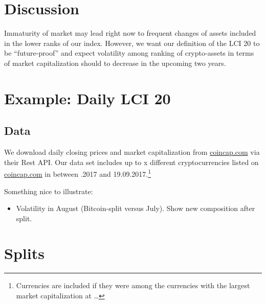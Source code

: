 \documentclass[11pt]{article}
\begin{document}
\section{Discussion}

Immaturity of market may lead right now to frequent changes of assets included in the lower ranks of our index.
However, we want our definition of the LCI 20 to be ``future-proof'' and expect volatility among ranking of crypto-assets in terms of market capitalization should to decrease in the upcoming two years.


\section{Example: Daily LCI 20}

\subsection{Data}

We download daily closing prices and market capitalization from \href{https://coincap.com}{coincap.com} via their Rest API. 
Our data set includes up to x different cryptocurrencies listed on \href{https://coincap.com}{coincap.com} in between .2017 and 19.09.2017.\footnote{Currencies are included if they were among the currencies with the largest market capitalization at \dots}


Something nice to illustrate:
\begin{itemize}
  \item Volatility in August (Bitcoin-split versus July). Show new composition after split.
\end{itemize}

\section{Splits}



\end{document}
